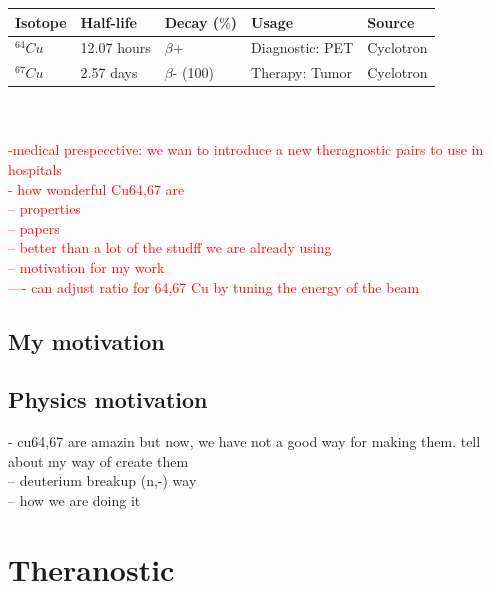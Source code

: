 \documentclass[twoside,english]{uiofysmaster/uiofysmaster}
\begin{document}
 \begin{tabular}{  p{3cm} p{3cm} p{3cm} p{3cm} p{3cm}   }
 \hline
Isotope  & Half-life & Decay ($\%$) & Usage & Source \\
 \hline
 $^{64}Cu$ &  12.07 hours & $\beta$+ & Diagnostic: PET & Cyclotron \\
 $^{67}Cu$ &  2.57 days & $\beta$- (100) & Therapy: Tumor & Cyclotron \\
 \hline
\end{tabular}
\\
\\
\textcolor{red}{-medical prespecctive: we wan to introduce a new theragnostic pairs to use in hospitals\\
- how wonderful Cu64,67 are\\
-- properties\\
-- papers\\
-- better than a lot of the studff we are already using\\
-- motivation for my work\\
---- can adjust ratio for 64,67 Cu by tuning the energy of the beam}\\



\subsection{My motivation}
\label{sec: my_motivation}




\subsection{Physics motivation}
\label{sec: physics_motivation}

- cu64,67 are amazin but now, we have not a good way for making them. tell about my way of create them\\
-- deuterium breakup (n,-) way\\
-- how we are doing it\\


\section{Theranostic}
\label{sec:theranostic}

\end{document}
